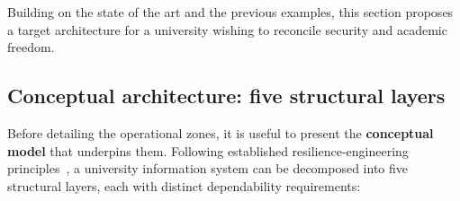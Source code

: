 Building on the state of the art and the previous examples, this
section proposes a target architecture for a university wishing to
reconcile security and academic freedom.

\subsection{Conceptual architecture: five structural layers}
\label{sec:concept-arch}

Before detailing the operational zones, it is useful to present the
\textbf{conceptual model} that underpins them. Following established
resilience-engineering principles~\cite{avizienis2004,nist-sp800-160v2},
a university information system can be decomposed into five structural
layers, each with distinct dependability requirements:

